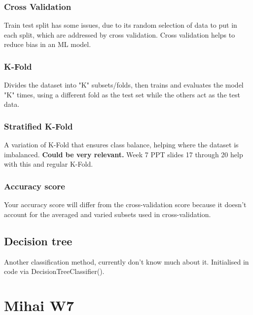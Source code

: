 \documentclass[12pt]{report}
\begin{document}
\subsubsection{Cross Validation}
Train test split has some issues, due to its random selection of data to put in each split, which are addressed by cross validation.
Cross validation helps to reduce bias in an ML model.
\subsubsection{K-Fold}
Divides the dataset into "K" subsets/folds, then trains and evaluates the model "K" times, using a different fold as the test set while the others 
act as the test data.
\subsubsection{Stratified K-Fold}
A variation of K-Fold that ensures class balance, helping where the dataset is imbalanced. \textbf{Could be very relevant.}
Week 7 PPT slides 17 through 20 help with this and regular K-Fold.
\subsubsection{Accuracy score}
Your accuracy score will differ from the cross-validation score because it doesn't account for the averaged and varied subsets
used in cross-validation.

\subsection{Decision tree}
Another classification method, currently don't know much about it.
Initialised in code via DecisionTreeClassifier().

\section{Mihai W7}
\end{document}
